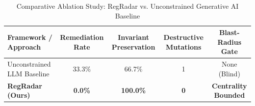 \begin{table}[htbp]
\centering
\caption{Comparative Ablation Study: RegRadar vs. Unconstrained Generative AI Baseline}
\label{tab:regradar_ablation}
\begin{tabular}{lcccc}
\hline
\textbf{Framework / Approach} & \textbf{Remediation Rate} & \textbf{Invariant Preservation} & \textbf{Destructive Mutations} & \textbf{Blast-Radius Gate} \\
\hline
Unconstrained LLM Baseline      & 33.3\% & 66.7\% & 1 & None (Blind) \\
\textbf{RegRadar (Ours)}      & \textbf{0.0\%} & \textbf{100.0\%} & \textbf{0} & \textbf{Centrality Bounded} \\
\hline
\end{tabular}
\end{table}